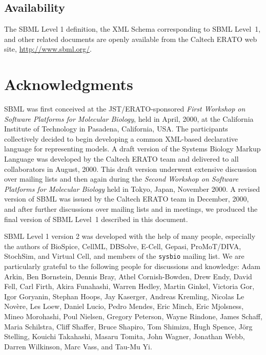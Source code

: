 \documentclass[10pt]{cekarticle}
\newcommand{\changed}[1]{\textcolor{BrickRed}{#1}}
\begin{document}
\subsection{Availability}
\label{sec:availability}

The SBML Level 1 definition, the XML Schema corresponding to SBML Level~1,
and other related documents are openly available from the Caltech ERATO web
site, \changed{\url{http://www.sbml.org/}}.



\setcounter{secnumdepth}{-1}
\section{Acknowledgments}
\label{sec:acknowledgements}

SBML was first conceived at the JST/ERATO-sponsored \emph{First Workshop on
  Software Platforms for Molecular Biology}, held in April, 2000, at the
California Institute of Technology in Pasadena, California, USA.  The
participants collectively decided to begin developing a common XML-based
declarative language for representing models.  A draft version of the
Systems Biology Markup Language was developed by the Caltech ERATO team and
delivered to all collaborators in August, 2000.  This draft version
underwent extensive discussion over mailing lists and then again during the
\emph{Second Workshop on Software Platforms for Molecular Biology} held in
Tokyo, Japan, November 2000.  A revised version of SBML was issued by the
Caltech ERATO team in December, 2000, and after further discussions over
mailing lists and in meetings, we produced the final version of SBML
Level~1 described in this document.

SBML Level 1 \changed{version 2} was developed with the help of many
people, especially the authors of BioSpice, \changed{CellML}, DBSolve,
E-Cell, Gepasi, \changed{ProMoT/DIVA}, StochSim, and Virtual Cell, and
members of the \texttt{sysbio} mailing list.  We are particularly grateful
to the following people for discussions and knowledge: \changed{Adam
  Arkin}, \changed{Ben Bornstein}, Dennis Bray, Athel Cornish-Bowden,
\changed{Drew Endy}, David Fell, Carl Firth, \changed{Akira Funahashi},
Warren Hedley, Martin Ginkel, \changed{Victoria Gor}, Igor Goryanin,
\changed{Stephan Hoops}, Jay Kaserger, Andreas Kremling, Nicolas Le
Nov\`{e}re, Les Loew, Daniel Lucio, Pedro Mendes, \changed{Eric Minch},
Eric Mjolsness, \changed{Mineo Morohashi}, \changed{Poul Nielsen},
\changed{Gregory Peterson}, \changed{Wayne Rindone}, James Schaff,
\changed{Maria Schilstra}, \changed{Cliff Shaffer}, Bruce Shapiro, Tom
Shimizu, Hugh Spence, J\"{o}rg Stelling, Kouichi Takahashi, Masaru Tomita,
John Wagner, \changed{Jonathan Webb}, \changed{Darren Wilkinson},
\changed{Marc Vass}, and \changed{Tau-Mu Yi}.
\end{document}
